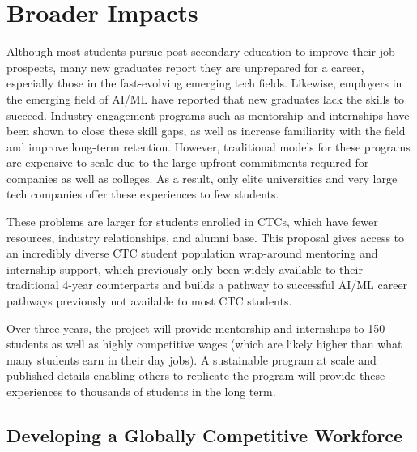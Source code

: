 \section{Broader Impacts}

Although most students pursue post-secondary education to improve their job prospects, \cite{alshahraniUsingSocialCognitive2018,helpsStudentExpectationsComputing2005,nortonPerceivedBenefitsUndergraduate2017} many new graduates report they are unprepared for a career,  especially those in the fast-evolving emerging tech fields.\cite{begelStrugglesNewCollege2008,craigListeningEarlyCareer2018,kapoorUnderstandingCSUndergraduate2019} Likewise, employers in the emerging field of AI/ML have reported that new graduates lack the skills to succeed.\cite{begelStrugglesNewCollege2008} Industry engagement programs such as mentorship and internships have been shown to close these skill gaps, as well as increase familiarity with the field and improve long-term retention. \cite{beaubouefComputerScienceCurriculum2011,frylingCatchEmEarly2018,tashakkoriEarlyParticipationCS2011,dahlbergImprovingRetentionGraduate2008,salinitriEffectsFormalMentoring2005,dennehyFemalePeerMentors2017,campbellFacultyStudentMentor1997b,mangoldWhoGoesWho2002} However, traditional models for these programs are expensive to scale due to the large upfront commitments required for companies as well as colleges. As a result, only elite universities\cite{cohenUsingInternalInternship1995} and very large tech companies offer these experiences to few students.

These problems are larger for students enrolled in CTCs, which have fewer resources, industry relationships, and alumni base. This proposal gives access to an incredibly diverse CTC student population wrap-around mentoring and internship support, which previously only been widely available to their traditional 4-year counterparts and builds a pathway to successful AI/ML career pathways previously not available to most CTC students. 

Over three years, the project will provide mentorship and internships to 150 students as well as highly competitive wages (which are likely higher than what many students earn in their day jobs). A sustainable program at scale and published details enabling others to replicate the program will provide these experiences to thousands of students in the long term.

\subsection{Developing a Globally Competitive Workforce}

